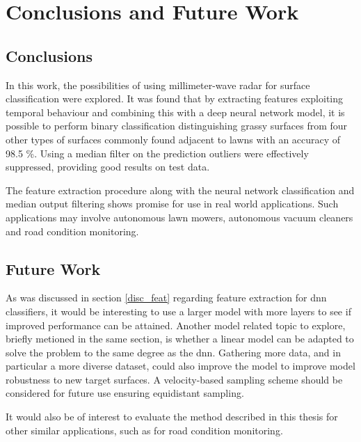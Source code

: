 \chapter{Conclusions and Future Work}

\section{Conclusions}

In this work, the possibilities of using millimeter-wave radar for surface classification were explored. It was found that by extracting features exploiting temporal behaviour and combining this with a deep neural network model, it is possible to perform binary classification distinguishing grassy surfaces from four other types of surfaces commonly found adjacent to lawns with an accuracy of 98.5 \%. Using a median filter on the prediction outliers were effectively suppressed, providing good results on test data. 

The feature extraction procedure along with the neural network classification and median output filtering shows promise for use in real world applications. Such applications may involve autonomous lawn mowers, autonomous vacuum cleaners and road condition monitoring. 



\section{Future Work}
As was discussed in section \ref{disc_feat} regarding feature extraction for \gls{dnn} classifiers, it would be interesting to use a larger model with more layers to see if improved performance can be attained. Another model related topic to explore, briefly metioned in the same section, is whether a linear model can be adapted to solve the problem to the same degree as the \gls{dnn}. Gathering more data, and in particular a more diverse dataset, could also improve the model to improve model robustness to new target surfaces. A velocity-based sampling scheme should be considered for future use ensuring equidistant sampling.

It would also be of interest to evaluate the method described in this thesis for other similar applications, such as for road condition monitoring. 


